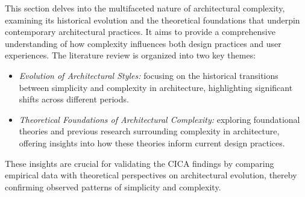 






This section delves into the multifaceted nature of architectural complexity, examining its historical evolution and the theoretical foundations that underpin contemporary architectural practices.
It aims to provide a comprehensive understanding of how complexity influences both design practices and user experiences.
The literature review is organized into two key themes:

\begin{itemize}
    \item \textit{Evolution of Architectural Styles:} focusing on the historical transitions between simplicity and complexity in architecture, highlighting significant shifts across different periods.
    \item \textit{Theoretical Foundations of Architectural Complexity:} exploring foundational theories and previous research surrounding complexity in architecture, offering insights into how these theories inform current design practices.
\end{itemize}

These insights are crucial for validating the CICA findings by comparing empirical data with theoretical perspectives on architectural evolution, thereby confirming observed patterns of simplicity and complexity.



